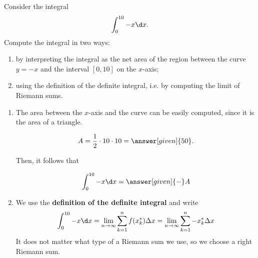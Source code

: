 \documentclass{ximera}
\begin{document}
\begin{example}
Consider the integral
\[
\int_0^{10}-x \d x.
\]
Compute the integral in two ways:
\begin{enumerate}
\item by interpreting the integral as the net area of the region between the curve $y=-x$ and the interval $[0,10]$ on  the $x$-axis;
\item using the definition of the definite integral, i.e. by computing the limit of Riemann sums.
\end{enumerate}
\begin{explanation}
\begin{enumerate}
\item The  area between the $x$-axis and the curve can be easily computed, since it is the area of a triangle.
\begin{image}
\end{image}

\[
A=\frac{1}{2}\cdot 10\cdot10=\answer[given]{50}.
\]

Then, it follows that

\[
\int_0^{10}-x \d x=\answer[given]{-}A
\]
\item We use the \textbf{definition of the definite integral} and write
\[
\int_0^{10}-x \d x=\lim_{n\to\infty}\sum_{k=1}^n f(x_k^*)\Delta x=\lim_{n\to\infty}\sum_{k=1}^n -x_k^*\Delta x
\]
It does not matter what  type of a Riemann sum we use, so we choose a right Riemann sum.


\end{enumerate}
\end{explanation}
\end{example}
\end{document}
